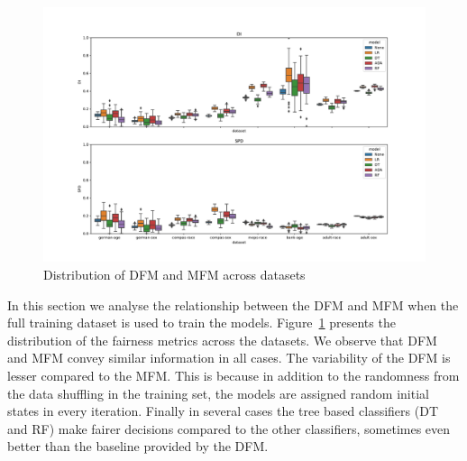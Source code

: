 \documentclass{article}
\begin{document}
\begin{figure}
  \centering
  \includegraphics[width=0.95\linewidth]{boxplot--dataset--di-spd--exp-full.pdf}
  \caption{Distribution of DFM and MFM across datasets}
  \label{fig:boxplot--dataset--di-spd--exp-full}
\end{figure}

In this section we analyse the relationship between the DFM and MFM
when the full training dataset is used to train the models.
Figure \ref{fig:boxplot--dataset--di-spd--exp-full} presents the
distribution of the fairness metrics across the datasets. We observe
that DFM and MFM convey similar information in all cases. The
variability of the DFM is lesser compared to the MFM. This is because
in addition to the randomness from the data shuffling in the training
set, the models are assigned random initial states in every iteration.
Finally in several cases the tree based classifiers (DT and RF) make
fairer decisions compared to the other classifiers, sometimes even
better than the baseline provided by the DFM.


\end{document}
